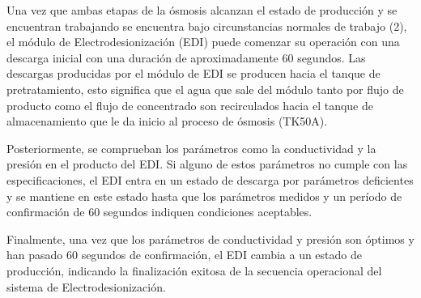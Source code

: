 
Una vez que ambas etapas de la ósmosis alcanzan el estado de producción y se encuentran trabajando
se encuentra bajo circunstancias normales de trabajo (2), el módulo de Electrodesionización (EDI) puede comenzar su
operación con una descarga inicial con una duración de aproximadamente 60 segundos. Las descargas
producidas por el módulo de EDI se producen hacia el tanque de pretratamiento, esto significa que el agua
que sale del módulo tanto por flujo de producto como el flujo de concentrado son recirculados hacia
el tanque de almacenamiento que le da inicio al proceso de ósmosis (TK50A).

Posteriormente, se comprueban los parámetros como la conductividad y la presión en el producto del EDI.
Si alguno de estos parámetros no cumple con las especificaciones, el EDI entra en un estado de descarga
por parámetros deficientes y se mantiene en este estado hasta que los parámetros medidos y un período
de confirmación de 60 segundos indiquen condiciones aceptables.

Finalmente, una vez que los parámetros de conductividad y presión son óptimos y han pasado 60 segundos
de confirmación, el EDI cambia a un estado de producción, indicando la finalización exitosa de la
secuencia operacional del sistema de Electrodesionización.




